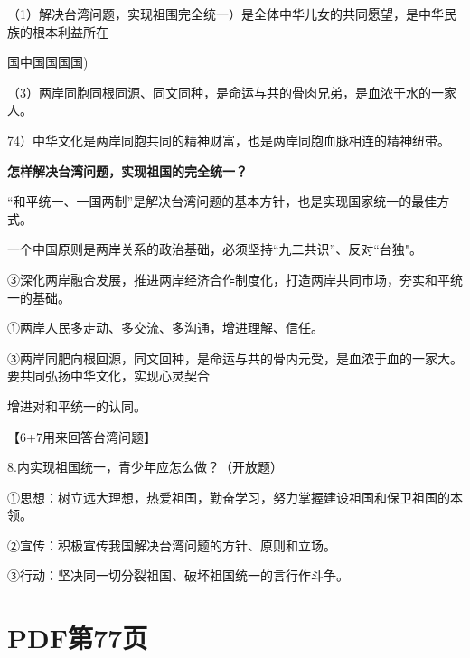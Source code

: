 \documentclass[lang=cn,11pt]{elegantbook}
\newcommand{\daofasym}[1]{{\daofasymbolfont #1}}
\newcommand{\daofasym}[1]{#1}
\begin{document}
（1）解决台湾问题，实现祖围完全统一）是全体中华儿女的共同愿望，是中华民族的根本利益所在\par

国中国国国国)\par

（3）两岸同胞同根同源、同文同种，是命运与共的骨肉兄弟，是血浓于水的一家人。\par

74）中华文化是两岸同胞共同的精神财富，也是两岸同胞血脉相连的精神纽带。\par

\textbf{怎样解决台湾问题，实现祖国的完全统一？}\par

“和平统一、一国两制”是解决台湾问题的基本方针，也是实现国家统一的最佳方式。\par

一个中国原则是两岸关系的政治基础，必须坚持“九二共识”、反对“台独"。\par

\daofasym{③}深化两岸融合发展，推进两岸经济合作制度化，打造两岸共同市场，夯实和平统一的基础。\par

\daofasym{①}两岸人民多走动、多交流、多沟通，增进理解、信任。\par

\daofasym{③}两岸同肥向根回源，同文回种，是命运与共的骨内元受，是血浓于血的一家大。要共同弘扬中华文化，实现心灵契合\par

增进对和平统一的认同。\par

【6+7用来回答台湾问题】\par

8.内实现祖国统一，青少年应怎么做？（开放题）\par

\daofasym{①}思想：树立远大理想，热爱祖国，勤奋学习，努力掌握建设祖国和保卫祖国的本领。\par

\daofasym{②}宣传：积极宣传我国解决台湾问题的方针、原则和立场。\par

\daofasym{③}行动：坚决同一切分裂祖国、破坏祖国统一的言行作斗争。\par


\section*{PDF第77页}
\end{document}
